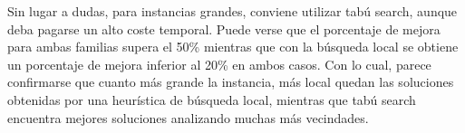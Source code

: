 \begin{figure}[h] 
 \centering
       \label{fig:randomDist1}
    \label{fig:randomMejora1}
\end{figure}

Sin lugar a dudas, para instancias grandes, conviene utilizar tabú search, aunque deba pagarse un alto coste temporal. Puede verse que el porcentaje de mejora para ambas familias supera el 50\% mientras que con la búsqueda local se obtiene un porcentaje de mejora inferior al 20\% en ambos casos. Con lo cual, parece confirmarse que cuanto más grande la instancia, más local quedan las soluciones obtenidas por una heurística de búsqueda local, mientras que tabú search encuentra mejores soluciones analizando muchas más vecindades.

